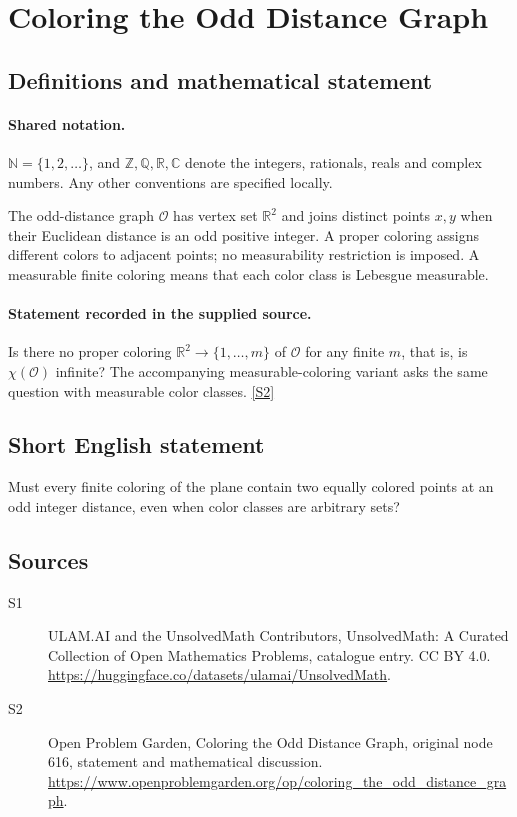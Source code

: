\documentclass[11pt]{article}
\newcommand{\sref}[2]{\hyperlink{source:#1:#2}{[S#2]}}
\begin{document}
\section{Coloring the Odd Distance Graph}\label{statement}

\subsection{Definitions and mathematical statement}

\paragraph{Shared notation.}$\mathbb N=\{1,2,\ldots\}$, and $\mathbb Z,\mathbb Q,\mathbb R,\mathbb C$ denote the integers, rationals, reals and complex numbers. Any other conventions are specified locally.


The odd-distance graph $\mathcal O$ has vertex set $\mathbb R^2$ and joins distinct points $x,y$ when their Euclidean distance is an odd positive integer. A proper coloring assigns different colors to adjacent points; no measurability restriction is imposed. A measurable finite coloring means that each color class is Lebesgue measurable.
\paragraph{Statement recorded in the supplied source.}
Is there no proper coloring $\mathbb R^2\to\{1,\ldots,m\}$ of $\mathcal O$ for any finite $m$, that is, is $\chi(\mathcal O)$ infinite? The accompanying measurable-coloring variant asks the same question with measurable color classes. \sref{statement}{2}
\subsection{Short English statement}
Must every finite coloring of the plane contain two equally colored points at an odd integer distance, even when color classes are arbitrary sets?
\subsection{Sources}
\begin{description}
\item[\hypertarget{source:statement:1}{S1}] ULAM.AI and the UnsolvedMath Contributors, UnsolvedMath: A Curated Collection of Open Mathematics Problems, catalogue entry. CC BY 4.0. \url{https://huggingface.co/datasets/ulamai/UnsolvedMath}.
\item[\hypertarget{source:statement:2}{S2}] Open Problem Garden, Coloring the Odd Distance Graph, original node 616, statement and mathematical discussion. \url{https://www.openproblemgarden.org/op/coloring_the_odd_distance_graph}.
\end{description}
\label{end:statement}
\end{document}
